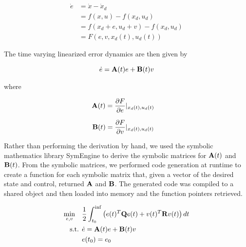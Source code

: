 \documentclass[conference]{IEEEtran}
\begin{document}
\begin{equation}
    \label{eq:nonlinear-error-dynamics}
    \begin{split}
        \dot{e} & = \dot{x} - \dot{x}_d \\
                & = f(x, u) - f(x_d, u_d) \\
                & = f(x_d + e, u_d + v) - f(x_d, u_d) \\
                & = F(e, v, x_d(t), u_d(t))
    \end{split}
\end{equation}

The time varying linearized error dynamics are then given by

\begin{equation}
    \label{eq:nonlinear-error-dynamics-lvi}
    \dot{e} = {\bf A}(t)e + {\bf B}(t)v
\end{equation}

where

\begin{equation}
    \label{eq:ltvA}
    \begin{aligned}
        {\bf A}(t) &= \frac{\partial F}{\partial e}|_{x_d(t),u_d(t)}
    \end{aligned}
\end{equation}

\begin{equation}
    \label{eq:ltvB}
    \begin{aligned}
        {\bf B}(t) &= \frac{\partial F}{\partial v}|_{x_d(t),u_d(t)}
    \end{aligned}
\end{equation}

Rather than performing the derivation by hand, we used the symbolic mathematics
library SymEngine \cite{symengine_repo} to derive the symbolic matrices for
${\bf A}(t)$ and ${\bf B}(t)$. From the symbolic matrices, we performed code
generation at runtime to create a function for each symbolic matrix that, given
a vector of the desired state and control, returned ${\bf A}$ and ${\bf B}$.
The generated code was compiled to a shared object and then loaded into memory
and the function pointers retrieved.

\begin{equation}
    \label{eq:var-linear-track-infinite-lqr}
    \begin{split}
        \min_{e, v} \ \ \  & \frac{1}{2} \int_{t_0}^{\inf} \left( e(t)^T {\bf Q}
            e(t) + v(t)^T {\bf R} v(t) \right)dt \\
        \text{s.t.   } & \dot{e} = {\bf{A}}(t)e + {\bf B}(t)v \\
                     & e(t_0) = e_0
    \end{split}
\end{equation}
\end{document}
